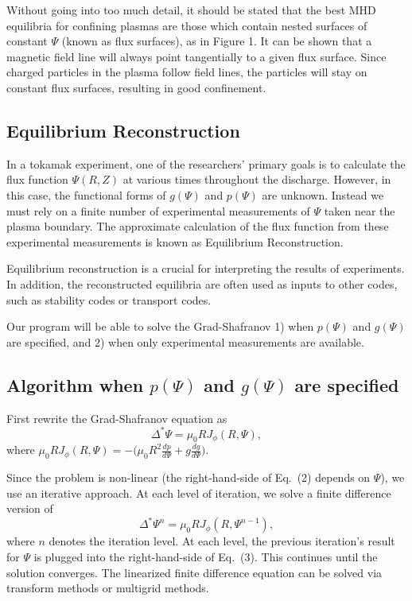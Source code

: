 \documentclass[paper=a4, fontsize=11pt]{scrartcl} %
\begin{document}
Without going into too much detail, it should be stated that the best MHD equilibria for confining plasmas are those which contain nested surfaces of constant $\Psi$ (known as flux surfaces), as in Figure 1.  It can be shown that a magnetic field line will always point tangentially to a given flux surface.  Since charged particles in the plasma follow field lines, the particles will stay on constant flux surfaces, resulting in good confinement.    



\subsection{Equilibrium Reconstruction}

In a tokamak experiment, one of the researchers' primary goals is to calculate the flux function $\Psi(R,Z)$ at various times throughout the discharge.  However, in this case, the functional forms of $g(\Psi)$ and $p(\Psi)$ are unknown.  Instead we must rely on a finite number of experimental measurements of $\Psi$ taken near the plasma boundary.  The approximate calculation of the flux function from these experimental measurements is known as Equilibrium Reconstruction.  

Equilibrium reconstruction is a crucial for interpreting the results of experiments. In addition, the reconstructed equilibria are often used as inputs to other codes, such as stability codes or transport codes.  

Our program will be able to solve the Grad-Shafranov 1) when $p(\Psi)$ and $g(\Psi)$ are specified, and 2) when only experimental measurements are available.

\subsection{Algorithm when $p(\Psi)$ and $g(\Psi)$ are specified}



First rewrite the Grad-Shafranov equation as
\begin{equation}
\Delta^{*}\Psi = \mu_0 R J_{\phi} (R, \Psi),
\end{equation}
where $\mu_0 R J_{\phi} (R,\Psi) = - \big(\mu_0 R^2 \frac{d p}{d\Psi} + g \frac{d g}{d\Psi}\big)$.

Since the problem is non-linear (the right-hand-side of Eq.~(2) depends on $\Psi$), we use an iterative approach.  At each level of iteration, we solve a finite difference version of 
\begin{equation}
\Delta^{*}\Psi^{n} = \mu_0 R J_\phi (R, \Psi^{n-1}),
\end{equation}
where $n$ denotes the iteration level. At each level, the previous iteration's result for $\Psi$ is plugged into the right-hand-side of Eq.~(3).  This continues until the solution converges.  The linearized finite difference equation can be solved via transform methods or multigrid methods.
\end{document}
